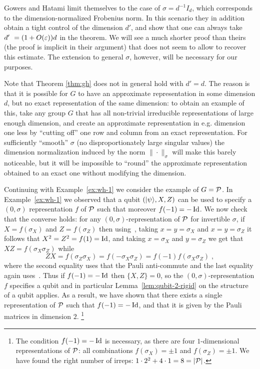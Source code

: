 Gowers and Hatami limit themselves to the case of $\sigma = d^{-1}I_d$, which corresponds to the dimension-normalized Frobenius norm. In this scenario they in addition obtain a tight control of the dimension $d'$, and show that one can always take $d'\ = (1+O(\varepsilon))d$ in the theorem. We will see a much shorter proof than theirs (the proof is implicit in their argument) that does not seem to allow to recover this estimate. The extension to general $\sigma$, however, will be necessary for our purposes.

Note that  Theorem \ref{thm:gh} does not in general hold  with $d'=d$. The reason is that it is possible for $G$ to have an approximate representation in some dimension $d$, but no exact representation of the same dimension: to obtain an example of this, take any group $G$ that has all non-trivial irreducible representations of large enough dimension, and create an approximate representation in e.g. dimension one less by ``cutting off'' one row and column from an exact representation. For sufficiently ``smooth'' $\sigma$ (no disproportionately large singular values) the dimension normalization induced by the norm $\|\cdot\|_\sigma$ will make this barely  noticeable, but it will be impossible to ``round'' the approximate representation obtained to an exact one without modifying the dimension. 

\begin{example}
\label{ex:wh-3}
Continuing with Example~\ref{ex:wh-1} we consider the example of $G= \mathcal{P}$. In Example~\ref{ex:wh-1} we observed that a qubit $(|\psi\rangle,X,Z)$ can be used to specify a $(0,\sigma)$ representation $f$ of $\mathcal{P}$ such that moreover $f(-1)=-\mathop{\rm Id}\nolimits$. We now check that the converse holds: for any $(0,\sigma)$-representation of $\mathcal{P}$ for invertible $\sigma$, if $X=f(\sigma_X)$ and $Z=f(\sigma_Z)$ then using~, taking $x=y=\sigma_X$ and $x=y=\sigma_Z$ it follows that $X^2 = Z^2=f(1)=\mathop{\rm Id}\nolimits$, and taking $x=\sigma_X$ and $y=\sigma_Z$ we get that $XZ=f(\sigma_X \sigma_Z)$ while 
\[ZX=f(\sigma_Z\sigma_X)=f(-\sigma_X\sigma_Z)=f(-1)f(\sigma_X\sigma_Z)\;,\]
where the second equality uses that the Pauli anti-commute and the last equality again uses~. Thus if $f(-1)=-\mathop{\rm Id}\nolimits$ then 
 $\{X,Z\}=0$, so the $(0,\sigma)$-representation $f$ specifies a qubit and in particular Lemma~\ref{lem:qubit-2-rigid} on the structure of a qubit applies. As a result, we have shown that there exists a single  representation of $\mathcal{P}$ such that $f(-1)=-\mathop{\rm Id}\nolimits$, and that it is given by the Pauli matrices in dimension $2$. 
\footnote{The condition $f(-1)=-\mathop{\rm Id}\nolimits$ is necessary, as there are four $1$-dimensional representations of $\mathcal{P}$: all combinations $f(\sigma_X)=\pm 1$ and $f(\sigma_Z)=\pm 1$. We have found the right number of irreps: $1\cdot 2^2 + 4\cdot 1 = 8 = |\mathcal{P}|$.}
\end{example}

